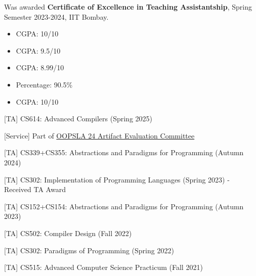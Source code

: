 \documentclass[10pt,a4paper,ragged2e]{altacv}
\begin{document}
Was awarded \textbf{Certificate of Excellence in Teaching Assistantship}, Spring Semester 2023-2024, IIT Bombay.
\smallskip




\clearpage


\begin{itemize}
    \item CGPA: 10/10
\end{itemize} 
\divider

\begin{itemize}
    \item CGPA: 9.5/10
\end{itemize} 
\divider

\begin{itemize}
    \item CGPA: 8.99/10
\end{itemize} 
\divider

\begin{itemize}
    \item Percentage: 90.5\%
\end{itemize}
\divider

\begin{itemize}
    \item CGPA: 10/10
\end{itemize}
\smallskip


[TA] CS614: Advanced Compilers (Spring 2025)
\smallskip

[Service] Part of \href{https://2024.splashcon.org/profile/meeteshkalpeshmehta}{OOPSLA 24 Artifact Evaluation Committee}
\smallskip

[TA] CS339+CS355: Abstractions and Paradigms for Programming (Autumn 2024)
\smallskip

[TA] CS302: Implementation of Programming Languages (Spring 2023) - Received TA Award
\smallskip

[TA] CS152+CS154: Abstractions and Paradigms for Programming (Autumn 2023)
\smallskip

[TA] CS502: Compiler Design (Fall 2022)
\smallskip

[TA] CS302: Paradigms of Programming (Spring 2022)
\smallskip

[TA] CS515: Advanced Computer Science Practicum (Fall 2021)
\smallskip

\nocite{*}
\end{document}
